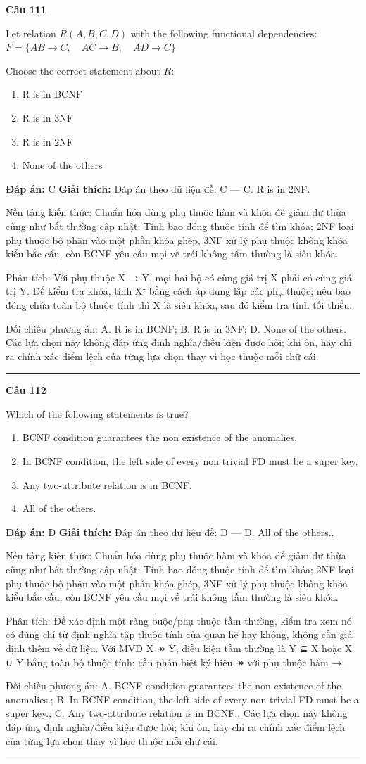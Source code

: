 \documentclass[11pt,a4paper]{article}
\newenvironment{question}[1]{%
  \par\vspace{1em}\noindent\textbf{\large Câu #1}\par\vspace{0.4em}
}{%
  \par\vspace{1em}\hrule\vspace{0.6em}
}
\newenvironment{choices}{%
  \begin{enumerate}[label=\textbf{\Alph*.},leftmargin=2.2em,itemsep=2pt,topsep=3pt]
}{%
  \end{enumerate}
}
\newcommand{\choice}{\item}
\begin{document}
\begin{question}{111}
Let relation \(R(A, B, C, D)\) with the following functional dependencies:
\(F = \{ AB \rightarrow C, \quad AC \rightarrow B, \quad AD \rightarrow C \}\)

Choose the correct statement about \(R\):
\begin{choices}
\choice R is in BCNF
\choice R is in 3NF
\choice R is in 2NF
\choice None of the others
\end{choices}
\textbf{Đáp án:} C
\textbf{Giải thích:} Đáp án theo dữ liệu đề: C — C. R is in 2NF.

Nền tảng kiến thức: Chuẩn hóa dùng phụ thuộc hàm và khóa để giảm dư thừa cũng như bất thường cập nhật. Tính bao đóng thuộc tính để tìm khóa; 2NF loại phụ thuộc bộ phận vào một phần khóa ghép, 3NF xử lý phụ thuộc không khóa kiểu bắc cầu, còn BCNF yêu cầu mọi vế trái không tầm thường là siêu khóa.

Phân tích: Với phụ thuộc X → Y, mọi hai bộ có cùng giá trị X phải có cùng giá trị Y. Để kiểm tra khóa, tính X⁺ bằng cách áp dụng lặp các phụ thuộc; nếu bao đóng chứa toàn bộ thuộc tính thì X là siêu khóa, sau đó kiểm tra tính tối thiểu.

Đối chiếu phương án: A. R is in BCNF; B. R is in 3NF; D. None of the others. Các lựa chọn này không đáp ứng định nghĩa/điều kiện được hỏi; khi ôn, hãy chỉ ra chính xác điểm lệch của từng lựa chọn thay vì học thuộc mỗi chữ cái.
\end{question}


\begin{question}{112}
Which of the following statements is true?
\begin{choices}
\choice BCNF condition guarantees the non existence of the anomalies.
\choice In BCNF condition, the left side of every non trivial FD must be a super key.
\choice Any two-attribute relation is in BCNF.
\choice All of the others.
\end{choices}
\textbf{Đáp án:} D
\textbf{Giải thích:} Đáp án theo dữ liệu đề: D — D. All of the others..

Nền tảng kiến thức: Chuẩn hóa dùng phụ thuộc hàm và khóa để giảm dư thừa cũng như bất thường cập nhật. Tính bao đóng thuộc tính để tìm khóa; 2NF loại phụ thuộc bộ phận vào một phần khóa ghép, 3NF xử lý phụ thuộc không khóa kiểu bắc cầu, còn BCNF yêu cầu mọi vế trái không tầm thường là siêu khóa.

Phân tích: Để xác định một ràng buộc/phụ thuộc tầm thường, kiểm tra xem nó có đúng chỉ từ định nghĩa tập thuộc tính của quan hệ hay không, không cần giả định thêm về dữ liệu. Với MVD X ↠ Y, điều kiện tầm thường là Y ⊆ X hoặc X ∪ Y bằng toàn bộ thuộc tính; cần phân biệt ký hiệu ↠ với phụ thuộc hàm →.

Đối chiếu phương án: A. BCNF condition guarantees the non existence of the anomalies.; B. In BCNF condition, the left side of every non trivial FD must be a super key.; C. Any two-attribute relation is in BCNF.. Các lựa chọn này không đáp ứng định nghĩa/điều kiện được hỏi; khi ôn, hãy chỉ ra chính xác điểm lệch của từng lựa chọn thay vì học thuộc mỗi chữ cái.
\end{question}
\end{document}

